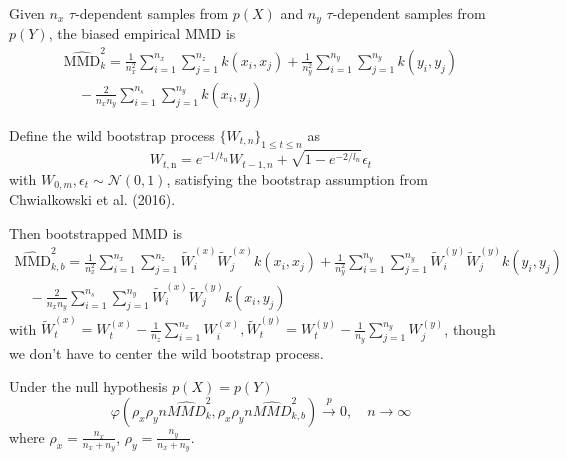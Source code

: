 \documentclass{article}
\begin{document}
Given $n_{x}$ $\tau$-dependent samples from $p(X)$ and $n_{y}$ $\tau$-dependent samples from $p(Y)$, the biased empirical MMD is
\begin{equation}
\begin{array}{c}
\widehat{\mathrm{MMD}}^{2}_{k}=\frac{1}{n_{x}^{2}} \sum_{i=1}^{n_{x}} \sum_{j=1}^{n_{z}} k\left(x_{i}, x_{j}\right)+\frac{1}{n_{y}^{2}} \sum_{i=1}^{n_{y}} \sum_{j=1}^{n_{y}} k\left(y_{i}, y_{j}\right) \\
\quad-\frac{2}{n_{x} n_{y}} \sum_{i=1}^{n_{s}} \sum_{j=1}^{n_{y}} k\left(x_{i}, y_{j}\right)
\end{array}
\end{equation}

Define the wild bootstrap process $\{W_{t,n}\}_{1\leq t\leq n}$ as
\begin{equation}
W_{t, \mathrm{n}}=e^{-1 / t_{n}} W_{t-1, n}+\sqrt{1-e^{-2 / l_{n}}} \epsilon_{t}
\end{equation}
with $W_{0,m}, \epsilon_{t} \sim \mathcal{N}(0,1)$, satisfying the bootstrap assumption from Chwialkowski et al. (2016).

Then bootstrapped MMD is
\begin{equation}
\begin{array}{c}
\widehat{\mathrm{MMD}}^{2}_{k, b}=\frac{1}{n_{x}^{2}} \sum_{i=1}^{n_{x}} \sum_{j=1}^{n_{z}} \tilde{W}_{i}^{(x)} \tilde{W}_{j}^{(x)} k\left(x_{i}, x_{j}\right)+\frac{1}{n_{y}^{2}} \sum_{i=1}^{n_{y}} \sum_{j=1}^{n_{y}} \tilde{W}_{i}^{(y)} \tilde{W}_{j}^{(y)} k\left(y_{i}, y_{j}\right) \\
\quad-\frac{2}{n_{x} n_{y}} \sum_{i=1}^{n_{s}} \sum_{j=1}^{n_{y}} \tilde{W}_{i}^{(x)} \tilde{W}_{j}^{(y)} k\left(x_{i}, y_{j}\right)
\end{array}
\end{equation}
with $\tilde{W}_{t}^{(x)}=W_{t}^{(x)}-\frac{1}{n_{z}} \sum_{i=1}^{n_{x}} W_{i}^{(x)}, \tilde{W}_{t}^{(y)}=W_{t}^{(y)}-\frac{1}{n_{y}} \sum_{j=1}^{n_{y}} W_{j}^{(y)}$, though we don't have to center the wild bootstrap process.

Under the null hypothesis $p(X) = p(Y)$
\begin{equation*}
    \varphi\left(\rho_{x} \rho_{y} n \widehat{MMD}^{2}_{k}, \rho_{x} \rho_{y} n \widehat{MMD}^{2}_{k, b}\right) \xrightarrow[]{p} 0, \quad n\rightarrow \infty
\end{equation*}
where $\rho_{x} = \frac{n_{x}}{n_{x} + n_{y}}$, $\rho_{y} = \frac{n_{y}}{n_{x} + n_{y}}$.
\end{document}
